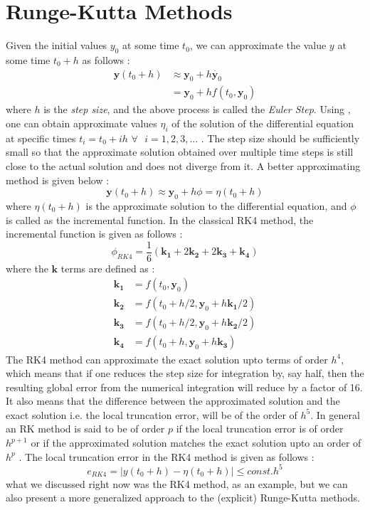 \section{Runge-Kutta Methods}
\label{RK}
Given the initial values $y_0$ at some time $t_0$, we can approximate the value $y$ at some time $t_0 + h$ as follows \cite{gillbook}:
\begin{align}
\label{euler1}
\mathbf{y}(t_0 +h) & \approx \mathbf{y}_0 + h \dot{\mathbf{y}_0}\\
\label{euler2}
& = \mathbf{y}_0 + h f(t_0, \mathbf{y}_0)
\end{align}
%
where $h$ is the \textit{step size}, and the above process is called the \textit{Euler Step}. Using , one can obtain approximate values $\eta_i$ of the solution of the differential equation at specific times $t_i = t_0 + ih$  $\forall \text{ } i = 1,2,3,...$ \cite{gillbook}. The step size should be sufficiently small so that the approximate solution obtained over multiple time steps is still close to the actual solution and does not diverge from it. A better approximating method is given below \cite{gillbook}:
\begin{equation}
\mathbf{y}(t_0 +h) \approx \mathbf{y}_0 + h\phi = \eta(t_0 + h)
\end{equation}
%
where $\eta(t_0 + h)$ is the approximate solution to the differential equation, and $\phi$ is called as the incremental function. In the classical \gls{RK4} method, the incremental function is given as follows \cite{gillbook}:
\begin{equation}
\phi_{RK4} = \frac{1}{6}(\mathbf{k_1} + 2\mathbf{k_2} + 2\mathbf{k_3} + \mathbf{k_4})
\end{equation}
%
where the $\mathbf{k}$ terms are defined as \cite{gillbook}:
\begin{align}
\mathbf{k_1} &= f(t_0, \mathbf{y}_0)\\
\mathbf{k_2} &= f(t_0 + h/2, \mathbf{y}_0 + h\mathbf{k_1}/2)\\
\mathbf{k_3} &= f(t_0 + h/2, \mathbf{y}_0 + h\mathbf{k_2}/2)\\
\mathbf{k_4} &= f(t_0 + h, \mathbf{y}_0 + h\mathbf{k_3})
\end{align}
%
The \gls{RK4} method can approximate the exact solution upto terms of order $h^4$, which means that if one reduces the step size for integration by, say half, then the resulting global error from the numerical integration will reduce by a factor of 16. It also means that the difference between the approximated solution and the exact solution i.e. the local truncation error, will be of the order of $h^5$. In general an \gls{RK} method is said to be of order $p$ if the local truncation error is of order $h^{p+1}$ or if the approximated solution matches the exact solution upto an order of $h^p$ \cite{feagin}. The local truncation error in the \gls{RK4} method is given as follows \cite{gillbook}:
\begin{equation}
\label{rk4_error}
e_{RK4} = |y(t_0 + h) - \eta(t_0 + h)| \leq const.h^5
\end{equation}
%
what we discussed right now was the \gls{RK4} method, as an example, but we can also present a more generalized approach to the (explicit) Runge-Kutta methods.

